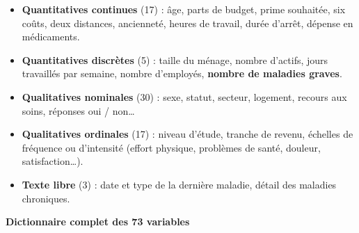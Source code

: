 \documentclass[

  french,

  10pt,

  a4paper,

]{article}
\providecommand{\tightlist}{%

  \setlength{\itemsep}{0pt}\setlength{\parskip}{0pt}}
\begin{document}
\begin{itemize}

\tightlist

\item

  \textbf{Quantitatives continues} (17) : âge, parts de budget, prime souhaitée, six coûts, deux distances, ancienneté, heures de travail, durée d'arrêt, dépense en médicaments.

\item

  \textbf{Quantitatives discrètes} (5) : taille du ménage, nombre d'actifs, jours travaillés par semaine, nombre d'employés, \textbf{nombre de maladies graves}.

\item

  \textbf{Qualitatives nominales} (30) : sexe, statut, secteur, logement, recours aux soins, réponses oui / non\ldots{}

\item

  \textbf{Qualitatives ordinales} (17) : niveau d'étude, tranche de revenu, échelles de fréquence ou d'intensité (effort physique, problèmes de santé, douleur, satisfaction\ldots).

\item

  \textbf{Texte libre} (3) : date et type de la dernière maladie, détail des maladies chroniques.

\end{itemize}



\textbf{Dictionnaire complet des 73 variables}
\end{document}
